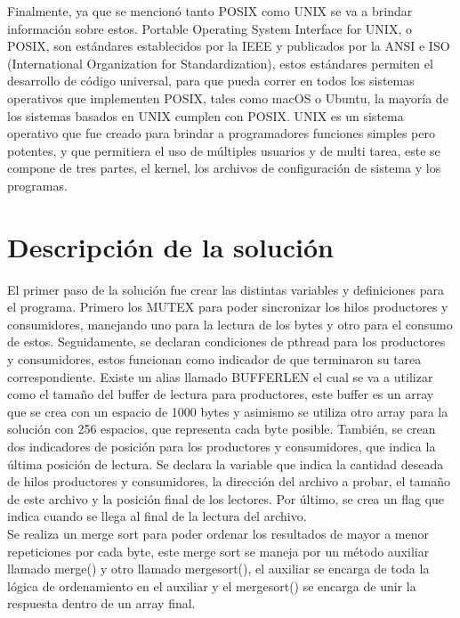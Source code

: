 \documentclass[10pt, article, natbib]{IEEEtran}
\begin{document}
Finalmente, ya que se mencionó tanto POSIX como UNIX se va a brindar información sobre estos. Portable Operating System Interface for UNIX, o POSIX, son estándares establecidos por la IEEE y publicados por la ANSI e ISO (International Organization for Standardization), estos estándares permiten el desarrollo de código universal, para que pueda correr en todos los sistemas operativos que implementen POSIX, tales como macOS o Ubuntu, la mayoría de los sistemas basados en UNIX cumplen con POSIX.\cite{universityinformationtechnologyservices_2021_about} UNIX es un sistema operativo que fue creado para brindar a programadores funciones simples pero potentes, y que permitiera el uso de múltiples usuarios y de multi tarea, este se compone de tres partes, el kernel, los archivos de configuración de sistema y los programas.\cite{idahostateuniversity_1997_what}

\section{Descripción de la solución}
El primer paso de la solución fue crear las distintas variables y definiciones para el programa. Primero los MUTEX para poder sincronizar los hilos productores y consumidores, manejando uno para la lectura de los bytes y otro para el consumo de estos.\cite{cppdev_2010_c} \cite{manrow_2011_c} Seguidamente, se declaran condiciones de pthread para los productores y consumidores, estos funcionan como indicador de que terminaron su tarea correspondiente.\cite{theopengroup_1997_pthread_cond_wait} Existe un alias llamado BUFFERLEN el cual se va a utilizar como el tamaño del buffer de lectura para productores, este buffer es un array que se crea con un espacio de 1000 bytes y asimismo se utiliza otro array para la solución con 256 espacios, que representa cada byte posible. También, se crean dos indicadores de posición para los productores y consumidores, que indica la última posición de lectura. Se declara la variable que indica la cantidad deseada de hilos productores y consumidores, la dirección del archivo a probar, el tamaño de este archivo y la posición final de los lectores. Por último, se crea un flag que indica cuando se llega al final de la lectura del archivo.\\

Se realiza un merge sort para poder ordenar los resultados de mayor a menor repeticiones por cada byte, este merge sort se maneja por un método auxiliar llamado merge() y otro llamado mergesort(), el auxiliar se encarga de toda la lógica de ordenamiento en el auxiliar y el mergesort() se encarga de unir la respuesta dentro de un array final.\\
\end{document}

